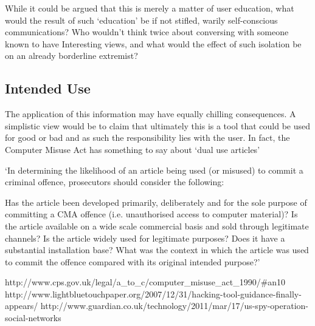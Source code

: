 While it could be argued that this is merely a matter of user education, what would the result of such `education' be if not stifled, warily self-conscious communications? Who wouldn't think twice about conversing with someone known to have Interesting views, and what would the effect of such isolation be on an already borderline extremist?

\subsection{Intended Use}
The application of this information may have equally chilling consequences. A simplistic view would be to claim that ultimately this is a tool that could be used for good or bad and as such the responsibility lies with the user.  In fact, the Computer Misuse Act has something to say about `dual use articles'

`In determining the likelihood of an article being used (or misused) to commit a criminal offence, prosecutors should consider the following:

    Has the article been developed primarily, deliberately and for the sole purpose of committing a CMA offence (i.e. unauthorised access to computer material)?
    Is the article available on a wide scale commercial basis and sold through legitimate channels?
    Is the article widely used for legitimate purposes?
    Does it have a substantial installation base?
    What was the context in which the article was used to commit the offence compared with its original intended purpose?'


http://www.cps.gov.uk/legal/a\_to\_c/computer\_misuse\_act\_1990/\#an10
http://www.lightbluetouchpaper.org/2007/12/31/hacking-tool-guidance-finally-appears/
http://www.guardian.co.uk/technology/2011/mar/17/us-spy-operation-social-networks

